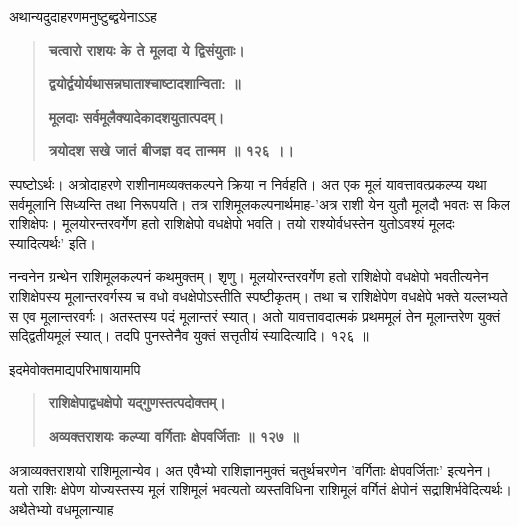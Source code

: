\documentclass[11pt, openany]{book}
\begin{document}
\begin{sloppypar}
\hangindent=0.2in \hspace{0.2in}अथान्यदुदाहरणमनुष्टुब्द्वयेनाऽऽह\textendash

\begin{quote}
\hspace{1in}\textbf{चत्वारो राशयः के ते मूलदा ये द्विसंयुताः।}

\hspace{1in}\textbf{द्वयोर्द्वयोर्यथासन्नघाताश्चाष्टादशान्विता: ॥}

\hspace{1in}\textbf{मूलदाः सर्वमूलैक्यादेकादशयुतात्पदम्।}

\hspace{1in}\textbf{त्रयोदश सखे जातं बीजज्ञ वद तान्मम ॥ १२६ ।।}
\end{quote}

\hangindent=0.2in \hspace{0.2in}स्पष्टोऽर्थः। अत्रोदाहरणे राशीनामव्यक्तकल्पने क्रिया न निर्वहति। अत एक मूलं यावत्तावत्प्रकल्प्य यथा सर्वमूलानि सिध्यन्ति तथा निरूपयति। तत्र राशिमूलकल्पनार्थमाह-'अत्र राशी येन युतौ मूलदौ भवतः स किल राशिक्षेपः। मूलयोरन्तरवर्गेण हतो राशिक्षेपो वधक्षेपो भवति। तयो राश्योर्वधस्तेन युतोऽवश्यं मूलदः स्यादित्यर्थः' इति।

\hangindent=0.2in \hspace{0.2in}नन्वनेन ग्रन्थेन राशिमूलकल्पनं कथमुक्तम्। शृणु। मूलयोरन्तरवर्गेण हतो राशिक्षेपो वधक्षेपो भवतीत्यनेन राशिक्षेपस्य मूलान्तरवर्गस्य च वधो वधक्षेपोऽस्तीति स्पष्टीकृतम्। तथा च राशिक्षेपेण वधक्षेपे भक्ते यल्लभ्यते स एव मूलान्तरवर्गः। अतस्तस्य पदं मूलान्तरं स्यात्। अतो यावत्तावदात्मकं प्रथममूलं तेन मूलान्तरेण युक्तं सद्द्वितीयमूलं स्यात्। तदपि पुनस्तेनैव युक्तं सत्तृतीयं स्यादित्यादि। १२६ ॥

\hangindent=0.2in \hspace{0.2in}इदमेवोक्तमाद्यपरिभाषायामपि\textendash

\begin{quote}
\hspace{1in}\textbf{राशिक्षेपाद्वधक्षेपो यद्गुणस्तत्पदोक्तम्।}

\hspace{1in}\textbf{अव्यक्तराशयः कल्प्या वर्गिताः क्षेपवर्जिताः ॥ १२७ ॥}
\end{quote}

\hangindent=0.2in \hspace{0.2in}अत्राव्यक्तराशयो राशिमूलान्येव। अत एवैभ्यो राशिज्ञानमुक्तं चतुर्थचरणेन 'वर्गिताः क्षेपवर्जिताः' इत्यनेन। यतो राशिः क्षेपेण योज्यस्तस्य मूलं राशिमूलं भवत्यतो व्यस्तविधिना राशिमूलं वर्गितं क्षेपोनं सद्राशिर्भवेदित्यर्थः। अथैतेभ्यो वधमूलान्याह\textendash


\end{sloppypar}
\end{document}
